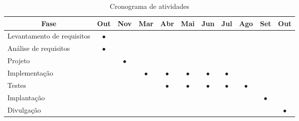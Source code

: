 \begin{table}[H]
	 \caption{Cronograma de atividades}
	 \label{tab:cronograma}
	 \begin{center}
		  \begin{tabular}{|l||c|c|c|c|c|c|c|c|c|c|}
			    \hline
			    \multicolumn{1}{|c||}{Fase} 	&Out     			&Nov     			&Mar     			&Abr   			&Mai 				&Jun 			&Jul 			&Ago			&Set				&Out\\ \hline
			    Levantamento de requisitos 	& $\bullet$  	&           	&          		&         		&  				&  			&  			&			&	 			&\\
			    An\'alise de requisitos    	& $\bullet$     &  				& 				&         		&  				&  			&  			& 			&				&\\
			    Projeto   				   	&           	&$\bullet$    	& 				& 				&  				&  			&  			& 			&				&\\
			    Implementa\c{c}\~ao   	   	&           	&          		&$\bullet$   	&$\bullet$    	&$\bullet$		&$\bullet$ 	&$\bullet$ 	&			&				&\\
			    Testes    				   	&           	&           	& 				&$\bullet$ 		&$\bullet$ 		&$\bullet$ 	&$\bullet$  &$\bullet$	&				&\\
			    Implanta\c{c}\~ao    	   	&           	&           	&				& 				&  				&  			&  			&		 	&$\bullet$		&\\
			    Divulga\c{c}\~ao 		   	& 				& 				&				&				&				& 			&			& 			& 				&$\bullet$\\
			    \hline
			  \end{tabular}
		 \vspace{8pt} %
		 \end{center}
\end{table}
